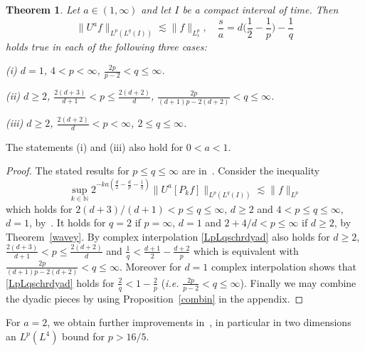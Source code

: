 \documentclass[11pt]{amsart}
\newtheorem{theorem}{Theorem}[section]
\theoremstyle{definition}
\numberwithin{theorem}{section}
\numberwithin{definition}{section}
\newcommand{\note}[1]{\footnote{\texttt{\Small #1}}}
\def\noi{\noindent}
\def\lc{\lesssim}
\def\bbN{{\mathbb {N}}}
\begin{document}
\begin{theorem} \label{Schrthm}
Let  $a\in(1,\infty)$
and let $I$ be a compact interval of time. Then
\begin{equation}\label{LpLqschr}
\big\|U^a f\big\|_{L^p(L^q(I))} \lc \|f\|_{L^p_s}, \quad \frac {s}{a}=
d\Big( \frac 12-\frac 1p\Big)- \frac 1q
\end{equation}
holds true in each of the following three  cases:

(i) $d=1$, $4<p<\infty$, $\frac{2p}{p-2}<q\le \infty$.

(ii) $d\ge 2$, $\frac{2(d+3)}{d+1}<p\le \frac{2(d+2)}d$, $\frac{2p}{(d+1)p-2(d+2)}<q\le\infty$.

(iii)   $d\ge 2$, $\frac{2(d+2)}{d}<p<\infty$, $2\le q\le \infty$.




\end{theorem}

\noi{\it Remark.}  The statements (i) and (iii) also hold for $0<a<1$.


\begin{proof}
The stated  results for $p\le q\le \infty$  are in~\cite{rose}.
Consider the inequality
\begin{equation}\label{LpLqschrdyad}
\sup_{k\in \bbN}2^{-k a( \frac d2-\frac dp- \frac 1q)}
\big\|U^a [P_k f]\big\|_{L^p(L^q(I))} \lc
\|f\|_{L^p}
\end{equation}
which holds for $2(d+3)/(d+1)<p\le q\le \infty$, $d\ge 2$  and
$4<p\le q\le \infty$, $d=1$, by~\cite{rose}. It holds for $q=2$ if $p=\infty$, $d=1$ and $2+4/d<p\le \infty$ if $d\ge 2$, by Theorem~\ref{wavey}.
By complex interpolation
\eqref {LpLqschrdyad} also  holds for
$d\ge 2$,  $\frac{2(d+3)}{d+1}<p\le \frac{2(d+2)}d$ and
$\frac 1q<\frac{d+1}{2}-\frac{d+2}p$ which is equivalent with
$\frac{2p}{(d+1)p-2(d+2)}<q\le\infty$. Moreover for $d=1$ complex interpolation shows that \eqref {LpLqschrdyad}   holds for $\frac 2q<1-\frac 2p$ ({\it i.e.}
$\frac{2p}{p-2}<q\le \infty$). Finally we may combine the dyadic pieces by
using Proposition~\ref{combin} in the appendix.
\end{proof}

\medskip

\noi {\it Remark.} For $a=2$, we obtain further
improvements in~\cite{lerose2}, in particular in two dimensions
 an $L^p(L^4)$ bound for $p>16/5$.
\end{document}
